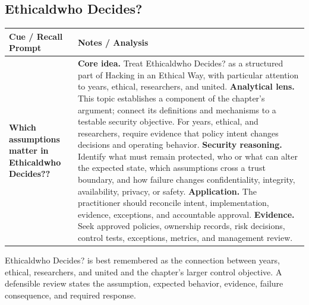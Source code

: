 \documentclass[11pt]{article}
\newcommand{\CornellHeader}{%
\rowcolor{Navy}\color{white}\bfseries Cue / Recall Prompt & \color{white}\bfseries Notes / Analysis\\\hline}
\newcommand{\CornellRow}[2]{%
\cellcolor{CueGray}\RaggedRight\textbf{#1} & \RaggedRight #2\\\hline}
\begin{document}
\subsection*{Ethicaldwho Decides?}
\begin{longtable}{>{\RaggedRight\arraybackslash}p{}|>{\RaggedRight\arraybackslash}p{}}
\CornellHeader
\CornellRow{Which assumptions matter in Ethicaldwho Decides??}{\textbf{Core idea.} Treat Ethicaldwho Decides? as a structured part of Hacking in an Ethical Way, with particular attention to years, ethical, researchers, and united. \textbf{Analytical lens.} This topic establishes a component of the chapter's argument; connect its definitions and mechanisms to a testable security objective. For years, ethical, and researchers, require evidence that policy intent changes decisions and operating behavior. \textbf{Security reasoning.} Identify what must remain protected, who or what can alter the expected state, which assumptions cross a trust boundary, and how failure changes confidentiality, integrity, availability, privacy, or safety. \textbf{Application.} The practitioner should reconcile intent, implementation, evidence, exceptions, and accountable approval. \textbf{Evidence.} Seek approved policies, ownership records, risk decisions, control tests, exceptions, metrics, and management review.}
\end{longtable}
\begin{topicsummary}
Ethicaldwho Decides? is best remembered as the connection between years, ethical, researchers, and united and the chapter's larger control objective. A defensible review states the assumption, expected behavior, evidence, failure consequence, and required response.
\end{topicsummary}
\end{document}
